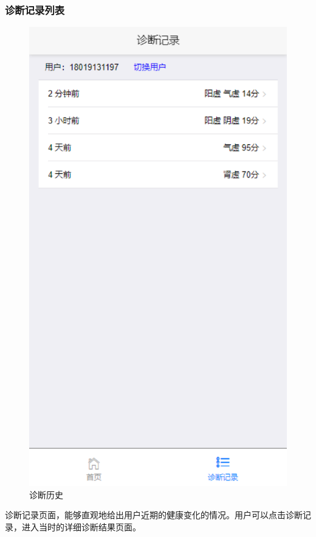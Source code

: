 \subsubsection{诊断记录列表}
\begin{figure}
    \centering
    \includegraphics{images/history.png}
    \caption{诊断历史}
    \label{fig:history}
\end{figure}
诊断记录页面，能够直观地给出用户近期的健康变化的情况。用户可以点击诊断记录，进入当时的详细诊断结果页面。

